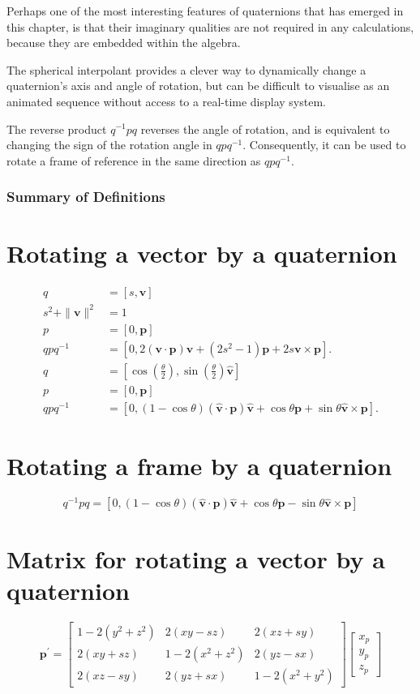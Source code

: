 \documentclass[10pt]{article}
\begin{document}
Perhaps one of the most interesting features of quaternions that has emerged in this chapter, is that their imaginary qualities are not required in any calculations, because they are embedded within the algebra.

The spherical interpolant provides a clever way to dynamically change a quaternion's axis and angle of rotation, but can be difficult to visualise as an animated sequence without access to a real-time display system.

The reverse product $q^{-1} p q$ reverses the angle of rotation, and is equivalent to changing the sign of the rotation angle in $q p q^{-1}$. Consequently, it can be used to rotate a frame of reference in the same direction as $q p q^{-1}$.

\subsubsection{Summary of Definitions}
\section{Rotating a vector by a quaternion}
$$
\begin{aligned}
q & =[s, \mathbf{v}] \\
s^{2}+\|\mathbf{v}\|^{2} & =1 \\
p & =[0, \mathbf{p}] \\
q p q^{-1} & =\left[0,2(\mathbf{v} \cdot \mathbf{p}) \mathbf{v}+\left(2 s^{2}-1\right) \mathbf{p}+2 s \mathbf{v} \times \mathbf{p}\right] . \\
q & =\left[\cos \left(\frac{\theta}{2}\right), \sin \left(\frac{\theta}{2}\right) \hat{\mathbf{v}}\right] \\
p & =[0, \mathbf{p}] \\
q p q^{-1} & =[0,(1-\cos \theta)(\hat{\mathbf{v}} \cdot \mathbf{p}) \hat{\mathbf{v}}+\cos \theta \mathbf{p}+\sin \theta \hat{\mathbf{v}} \times \mathbf{p}] .
\end{aligned}
$$

\section{Rotating a frame by a quaternion}
$$
q^{-1} p q=[0,(1-\cos \theta)(\hat{\mathbf{v}} \cdot \mathbf{p}) \hat{\mathbf{v}}+\cos \theta \mathbf{p}-\sin \theta \hat{\mathbf{v}} \times \mathbf{p}]
$$

\section{Matrix for rotating a vector by a quaternion}
$$
\mathbf{p}^{\prime}=\left[\begin{array}{ccc}
1-2\left(y^{2}+z^{2}\right) & 2(x y-s z) & 2(x z+s y) \\
2(x y+s z) & 1-2\left(x^{2}+z^{2}\right) & 2(y z-s x) \\
2(x z-s y) & 2(y z+s x) & 1-2\left(x^{2}+y^{2}\right)
\end{array}\right]\left[\begin{array}{c}
x_{p} \\
y_{p} \\
z_{p}
\end{array}\right]
$$
\end{document}
